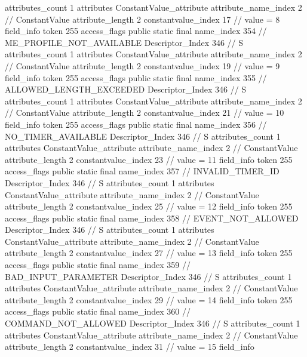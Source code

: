 {{{{{				attributes_count	1
				attributes {
				ConstantValue_attribute {
					attribute_name_index	2		// ConstantValue
					attribute_length	2
					constantvalue_index	17		// value = 8
				}
				}
			}
			field_info {
				token	255
				access_flags	public static final
				name_index	354		// ME_PROFILE_NOT_AVAILABLE
				Descriptor_Index	346		// S
				attributes_count	1
				attributes {
				ConstantValue_attribute {
					attribute_name_index	2		// ConstantValue
					attribute_length	2
					constantvalue_index	19		// value = 9
				}
				}
			}
			field_info {
				token	255
				access_flags	public static final
				name_index	355		// ALLOWED_LENGTH_EXCEEDED
				Descriptor_Index	346		// S
				attributes_count	1
				attributes {
				ConstantValue_attribute {
					attribute_name_index	2		// ConstantValue
					attribute_length	2
					constantvalue_index	21		// value = 10
				}
				}
			}
			field_info {
				token	255
				access_flags	public static final
				name_index	356		// NO_TIMER_AVAILABLE
				Descriptor_Index	346		// S
				attributes_count	1
				attributes {
				ConstantValue_attribute {
					attribute_name_index	2		// ConstantValue
					attribute_length	2
					constantvalue_index	23		// value = 11
				}
				}
			}
			field_info {
				token	255
				access_flags	public static final
				name_index	357		// INVALID_TIMER_ID
				Descriptor_Index	346		// S
				attributes_count	1
				attributes {
				ConstantValue_attribute {
					attribute_name_index	2		// ConstantValue
					attribute_length	2
					constantvalue_index	25		// value = 12
				}
				}
			}
			field_info {
				token	255
				access_flags	public static final
				name_index	358		// EVENT_NOT_ALLOWED
				Descriptor_Index	346		// S
				attributes_count	1
				attributes {
				ConstantValue_attribute {
					attribute_name_index	2		// ConstantValue
					attribute_length	2
					constantvalue_index	27		// value = 13
				}
				}
			}
			field_info {
				token	255
				access_flags	public static final
				name_index	359		// BAD_INPUT_PARAMETER
				Descriptor_Index	346		// S
				attributes_count	1
				attributes {
				ConstantValue_attribute {
					attribute_name_index	2		// ConstantValue
					attribute_length	2
					constantvalue_index	29		// value = 14
				}
				}
			}
			field_info {
				token	255
				access_flags	public static final
				name_index	360		// COMMAND_NOT_ALLOWED
				Descriptor_Index	346		// S
				attributes_count	1
				attributes {
				ConstantValue_attribute {
					attribute_name_index	2		// ConstantValue
					attribute_length	2
					constantvalue_index	31		// value = 15
				}
				}
			}
			field_info {
}}}}}
